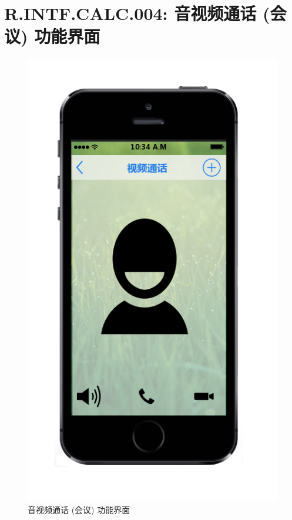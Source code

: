     \section{R.INTF.CALC.004: 音视频通话 (会议) 功能界面}
    \begin{figure}[h]
        \centering
        \includegraphics[scale=0.6]{OutlineDesign/figures/音视频通话会议功能界面.png}
        \caption{音视频通话 (会议) 功能界面}
        \label{fig:server_flow}
    \end{figure}
    \newpage
